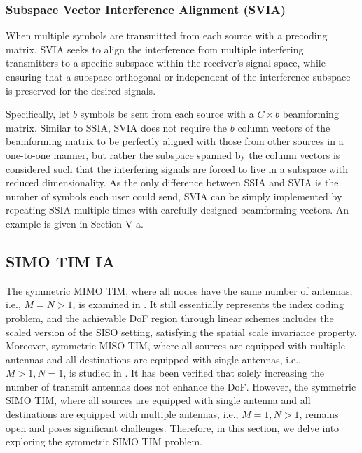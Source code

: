 \documentclass[a4paper,journal]{IEEEtran}
\begin{document}
\subsubsection{Subspace Vector Interference Alignment (SVIA)}
When multiple symbols are transmitted from each source with a precoding matrix, SVIA 
seeks to align the interference from multiple interfering transmitters to a specific subspace within the receiver's signal space, while ensuring that a subspace orthogonal or independent of the interference subspace is preserved for the desired signals. 


Specifically, let $b$ symbols be sent from each source with a $C \times b$ beamforming matrix. Similar to SSIA, SVIA does not require the $b$ column vectors of the beamforming matrix to be perfectly aligned with those from other sources in a one-to-one manner, but rather the subspace spanned by the column vectors is considered such that the interfering signals are forced to live in a subspace with reduced dimensionality.
As the only difference between SSIA and SVIA is the number of symbols each user could send, SVIA can be simply implemented by repeating SSIA multiple times with carefully designed beamforming vectors. An example is given in Section V-a.


\subsection{SIMO TIM IA}
The symmetric MIMO TIM, where all nodes have the same number of antennas, i.e., $M=N>1$, is examined in \cite{jafar2013topological}. It still essentially represents the index coding problem, and the achievable DoF region through linear schemes includes the scaled version of the SISO setting, satisfying the spatial scale invariance property. Moreover, symmetric MISO TIM, where all sources are equipped with multiple antennas and all destinations are equipped with single antennas, i.e., $M>1,N=1$, is studied in \cite{sun2014topologicalMIMO}. It has been verified that solely increasing the number of transmit antennas does not enhance the DoF. However, the symmetric SIMO TIM, where all sources are equipped with single antenna and all destinations are equipped with multiple antennas, i.e., $M=1,N>1$, remains open and poses significant challenges. Therefore, in this section, we delve into exploring the symmetric SIMO TIM problem.
\end{document}

